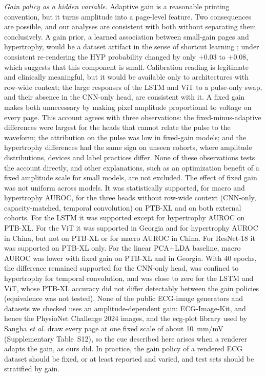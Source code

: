 \documentclass{wlscirep}
\begin{document}
\emph{Gain policy as a hidden variable.} Adaptive gain is a reasonable printing convention, but it turns amplitude into a page-level feature. Two consequences are possible, and our analyses are consistent with both without separating them conclusively. A gain prior, a learned association between small-gain pages and hypertrophy, would be a dataset artifact in the sense of shortcut learning \cite{geirhos2020shortcut}; under consistent re-rendering the HYP probability changed by only $+0.03$ to $+0.08$, which suggests that this component is small. Calibration reading is legitimate and clinically meaningful, but it would be available only to architectures with row-wide context; the large responses of the LSTM and ViT to a pulse-only swap, and their absence in the CNN-only head, are consistent with it. A fixed gain makes both unnecessary by making pixel amplitude proportional to voltage on every page. This account agrees with three observations: the fixed-minus-adaptive differences were largest for the heads that cannot relate the pulse to the waveform; the attribution on the pulse was low in fixed-gain models; and the hypertrophy differences had the same sign on unseen cohorts, where amplitude distributions, devices and label practices differ. None of these observations tests the account directly, and other explanations, such as an optimization benefit of a fixed amplitude scale for small models, are not excluded. The effect of fixed gain was not uniform across models. It was statistically supported, for macro and hypertrophy AUROC, for the three heads without row-wide context (CNN-only, capacity-matched, temporal convolution) on PTB-XL and on both external cohorts. For the LSTM it was supported except for hypertrophy AUROC on PTB-XL. For the ViT it was supported in Georgia and for hypertrophy AUROC in China, but not on PTB-XL or for macro AUROC in China. For ResNet-18 it was supported on PTB-XL only. For the linear PCA+LDA baseline, macro AUROC was lower with fixed gain on PTB-XL and in Georgia. With 40 epochs, the difference remained supported for the CNN-only head, was confined to hypertrophy for temporal convolution, and was close to zero for the LSTM and ViT, whose PTB-XL accuracy did not differ detectably between the gain policies (equivalence was not tested). None of the public ECG-image generators and datasets we checked uses an amplitude-dependent gain: ECG-Image-Kit, and hence the PhysioNet Challenge 2024 images, and the ecg-plot library used by Sangha \emph{et al.} draw every page at one fixed scale of about 10~mm/mV \cite{shivashankara2024ecgimagekit,reyna2024challenge,reyna2024imagedatabase,sangha2022images} (Supplementary Table~S12), so the cue described here arises when a renderer adapts the gain, as ours did. In practice, the gain policy of a rendered ECG dataset should be fixed, or at least reported and varied, and test sets should be stratified by gain.
\end{document}
